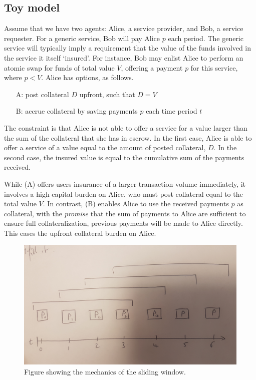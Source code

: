 \subsection{Toy model}

Assume that we have two agents: Alice, a service provider, and Bob, a service requester. 
For a generic service, Bob will pay Alice $p$ each period.
The generic service will typically imply a requirement that the value of the funds involved in the service it itself `insured'.
For instance, Bob may enlist Alice to perform an atomic swap for funds of total value $V$, offering a payment $p$ for this service, where $p<V$.
Alice has options, as follows.

\begin{enumerate}
    \item[A:] post collateral $D$ upfront, such that $D=V$
    \item[B:] accrue collateral by saving payments $p$ each time period $t$
\end{enumerate}

The constraint is that Alice is not able to offer a service for a value larger than the sum of the collateral that she has in escrow. 
In the first case, Alice is able to offer a service of a value equal to the amount of posted collateral, $D$.
In the second case, the insured value is equal to the cumulative sum of the payments received.

While (A) offers users insurance of a larger transaction volume immediately, it involves a high capital burden on Alice, who must post collateral equal to the total value $V$. 
In contrast, (B) enables Alice to use the received payments $p$ as collateral, with the \textit{promise} that the sum of payments to Alice are sufficient to ensure full collateralization, previous payments will be made to Alice directly.
This eases the upfront collateral burden on Alice.

\begin{figure}
    \centering
    \includegraphics[width=\textwidth]{promise/figures/slidingwindows.jpg}
    \caption{Figure showing the mechanics of the sliding window.}
    \label{fig:slidingwindows}
\end{figure}

